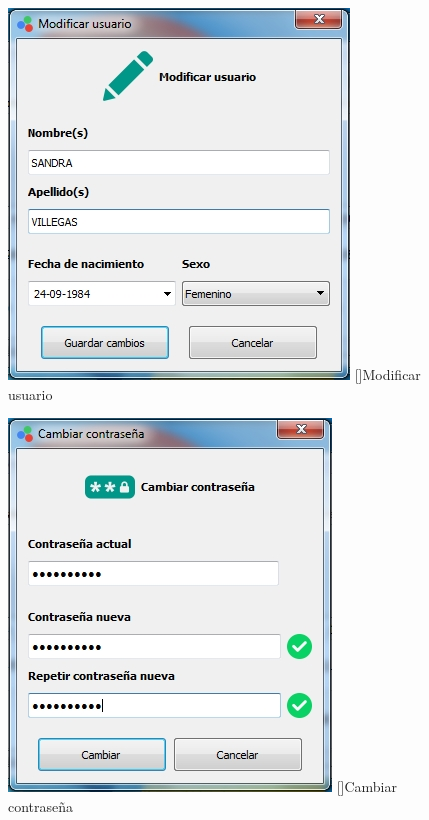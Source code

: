 \begin{figure}[H]
\centering
\begin{minipage}{.5\textwidth}
  \centering
  \includegraphics[width=.9\linewidth]{./img/modificar-usuario.jpg}
  []{Modificar usuario\label{fig:modificar-usuario}}
  \label{fig:test1}
\end{minipage}%
\begin{minipage}{.5\textwidth}
  \centering
  \includegraphics[width=.9\linewidth]{./img/cambiar-clave.jpg}
  []{Cambiar contrase\~{n}a\label{fig:cambiar-clave}}
  \label{fig:test2}
\end{minipage}
\end{figure}

